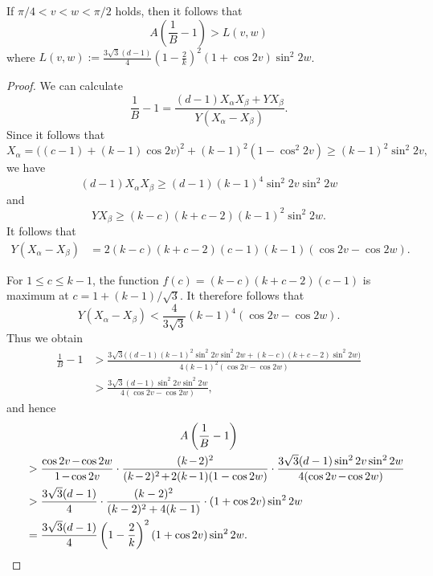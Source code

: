 \documentclass[ALCO,ThmDefs,Unicode,epreuves]{cedram}
\newcommand*{\Mk}{\mkern -2mu}
\begin{document}
\begin{lemm} \label{lem:L}
If $\pi /4 < v < w < \pi /2$ holds, then it follows that 
\[
A\left(\frac{1}{B}-1\right) >L(v,w)
\]
where $L(v,w):=\frac{3\sqrt{3} (d-1)}{4} \left(1-\frac{2}{k} \right)^2 
(1+\cos 2v) \sin^2 2 w$. 
\end{lemm}
\begin{proof}
We can calculate
\[
\frac{1}{B}-1=\frac{(d-1)X_\alpha X_\beta+Y X_\beta}{Y(X_\alpha-X_\beta)}. 
\]
Since it follows that 
\[X_\alpha%
=\big((c-1) +(k-1) \cos 2v \big)^2+(k-1)^2(1-\cos^2 2v) \geq (k-1)^2\sin^2 2v,\] 
we have
\[
(d-1)X_\alpha X_\beta \geq (d-1)(k-1)^4\sin^2 2v\sin^2 2w
\]
and \[
YX_\beta \geq (k-c)(k+c-2)(k-1)^2\sin^2 2w.
\] 
It follows that 
\begin{align*}
Y(X_\alpha-X_\beta)&=2(k-c)(k+c-2)(c-1)(k-1)(\cos 2v-\cos 2w).
\end{align*}

For $1\leq c \leq k-1$, the function $f(c)=(k-c)(k+c-2)(c-1)$ is maximum at $c=1+(k-1)/\sqrt{3}$. It therefore follows that
\[
Y(X_\alpha-X_\beta)<\frac{4}{3\sqrt{3}}(k-1)^4(\cos 2v-\cos 2w). 
\]
Thus we obtain 
\begin{align*}
\frac{1}{B}-1&>
\frac{3\sqrt{3}\big( (d-1)(k-1)^2\sin^2 2v\sin^2 2w+(k-c)(k+c-2)\sin^2 2w\big)}{4(k-1)^2(\cos 2v-\cos 2w)}\\
&>\frac{3\sqrt{3} (d-1)\sin^2 2v\sin^2 2w}{4(\cos 2v-\cos 2w)},
\end{align*}
and hence
\begin{multline*}
A\left(\frac{1}{B}-1\right) \\
\begin{aligned}[b]
&> \frac{\cos 2v\Mk -\Mk \cos 2w}{1\Mk -\Mk \cos 2v} \cdot \frac{(k\Mk -\Mk 2)^2}{(k\Mk -\Mk 2)^2\Mk +\Mk 2(k\Mk -\Mk 1)(1 - \cos 2w) } \cdot
\frac{3\sqrt{3} (d - 1)\sin^2 2v\sin^2 2w}{4(\cos 2v\Mk -\Mk \cos 2w)}\\
&>\frac{3\sqrt{3} (d-1)}{4} \cdot \frac{(k-2)^2}{(k-2)^2+4(k-1) }\cdot 
(1+\cos 2v) \sin^2 2 w\\
&=\frac{3\sqrt{3} (d-1)}{4} \left(1-\frac{2}{k} \right)^2 
(1+\cos 2v) \sin^2 2 w .
\end{aligned}\qedhere\hspace*{-4mm}
\end{multline*}
\end{proof}
\end{document}
